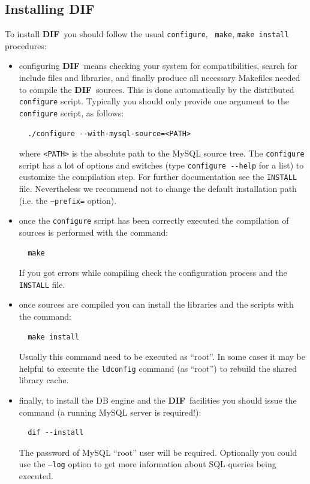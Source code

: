 \documentclass[10pt,titlepage]{article}
\newcommand{\dif}{\textbf{\small DIF}}
\begin{document}
\subsection{Installing \dif}
\label{sec:installing}

To install \dif\ you should follow the usual {\tt configure}, {\tt
  make}, {\tt make install} procedures:

\begin{itemize}
\item configuring \dif\ means checking your system for compatibilities,
  search for include files and libraries, and finally produce all
  necessary \textsf{Makefile}s needed to compile the \dif\
  sources. This is done automatically by the distributed
  \verb|configure| script. Typically you should only provide one
  argument to the \verb|configure| script, as follows:
\begin{verbatim}
  ./configure --with-mysql-source=<PATH>
\end{verbatim}
  where \verb|<PATH>| is the absolute path to the MySQL source
  tree. The \verb|configure| script has a lot of options and switches
  (type \verb|configure --help| for a list) to customize the
  compilation step. For further documentation see the \verb|INSTALL|
  file. Nevertheless we recommend not to change the default
  installation path (i.e. the {\tt --prefix=} option).

\item once the \verb|configure| script has been correctly executed
  the compilation of sources is performed with the command:
\begin{verbatim}
  make
\end{verbatim}
  If you got errors while compiling check the configuration process
  and the \verb|INSTALL| file.

\item once sources are compiled you can install the libraries and the
  scripts with the command:
\begin{verbatim}
  make install
\end{verbatim}
  Usually this command need to be executed as ``root''. In some cases
  it may be helpful to execute the {\tt ldconfig} command (as
  ``root'') to rebuild the shared library cache.

\item finally, to install the DB engine and the \dif\ facilities you
  should issue the command (a running MySQL server is required!):
\begin{verbatim}
  dif --install
\end{verbatim}
  The password of MySQL ``root'' user will be required. Optionally you
  could use the {\tt --log} option to get more information about SQL
  queries being executed.
\end{itemize}
%
\end{document}
